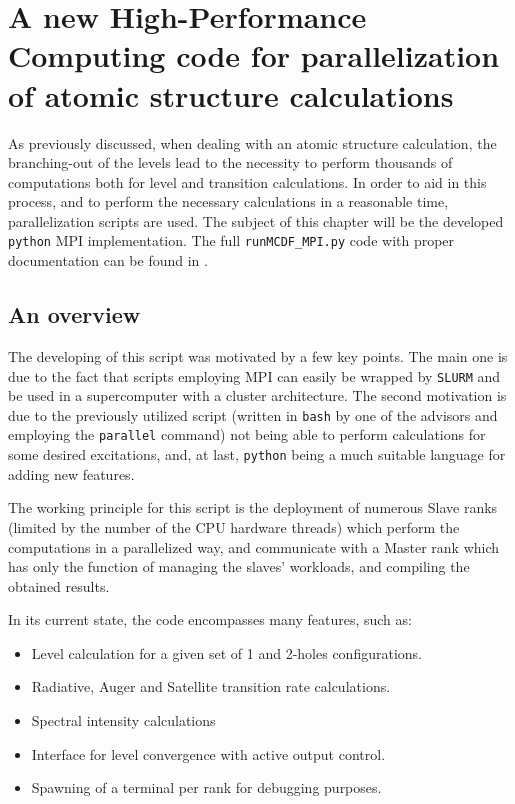 
%

\chapter{A new High-Performance Computing code for parallelization of atomic structure calculations}

As previously discussed, when dealing with an atomic structure calculation, the branching-out of the levels lead to the necessity to perform thousands of computations both for level and transition calculations. In order to aid in this process, and to perform the necessary calculations in a reasonable time, parallelization scripts are used. The subject of this chapter will be the developed \verb|python| \gls{MPI} implementation. The full \verb|runMCDF_MPI.py| code with proper documentation can be found in .

\section{An overview}

The developing of this script was motivated by a few key points. The main one is due to the fact that scripts employing \gls{MPI} can easily be wrapped by \verb|SLURM| and be used in a supercomputer with a cluster architecture. The second motivation is due to the previously utilized script (written in \verb|bash| by one of the advisors and employing the \verb|parallel| command) not being able to perform calculations for some desired excitations, and, at last, \verb|python| being a much suitable language for adding new features.

The working principle for this script is the deployment of numerous Slave ranks (limited by the number of the CPU hardware threads) which perform the computations in a parallelized way, and communicate with a Master rank which has only the function of managing the slaves' workloads, and compiling the obtained results.

In its current state, the code encompasses many features, such as:

\begin{itemize}
    \item Level calculation for a given set of 1 and 2-holes configurations.
    \item Radiative, Auger and Satellite transition rate calculations.
    \item Spectral intensity calculations
    \item Interface for level convergence with active output control.
    \item Spawning of a terminal per rank for debugging purposes.
\end{itemize}

